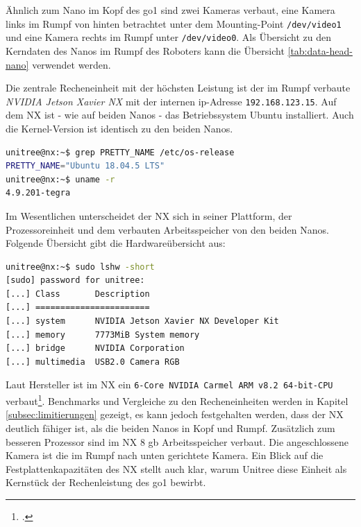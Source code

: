 Ähnlich zum Nano im Kopf des \gls{go1} sind zwei Kameras verbaut, eine Kamera links im Rumpf von hinten betrachtet unter dem Mounting-Point
\texttt{/dev/video1} und eine Kamera rechts im Rumpf unter \texttt{/dev/video0}.
Als Übersicht zu den Kerndaten des Nanos im Rumpf des Roboters kann die Übersicht \ref{tab:data-head-nano} verwendet werden.

\label{par:nx}

Die zentrale Recheneinheit mit der höchsten Leistung ist der im Rumpf verbaute \emph{NVIDIA Jetson Xavier NX} mit der internen
\gls{ip}-Adresse \texttt{192.168.123.15}.
Auf dem NX ist - wie auf beiden Nanos - das Betriebssystem Ubuntu installiert.
Auch die Kernel-Version ist identisch zu den beiden Nanos.

\begin{lstlisting}[language=sh, label=lst:nx-os]
unitree@nx:~$ grep PRETTY_NAME /etc/os-release
PRETTY_NAME="Ubuntu 18.04.5 LTS"
unitree@nx:~$ uname -r
4.9.201-tegra
\end{lstlisting}

Im Wesentlichen unterscheidet der NX sich in seiner Plattform, der Prozessoreinheit und dem verbauten Arbeitsspeicher
von den beiden Nanos.
Folgende Übersicht gibt die Hardwareübersicht aus:

\begin{lstlisting}[language=sh, label=lst:nanos-hardware-rumpf-nx, columns=fixed]
unitree@nx:~$ sudo lshw -short
[sudo] password for unitree:
[...] Class       Description
[...] =======================
[...] system      NVIDIA Jetson Xavier NX Developer Kit
[...] memory      7773MiB System memory
[...] bridge      NVIDIA Corporation
[...] multimedia  USB2.0 Camera RGB
\end{lstlisting}

Laut Hersteller ist im NX ein \texttt{6-Core NVIDIA Carmel ARM v8.2 64-\allowbreak bit-\allowbreak CPU} verbaut\footcite{nvidia_website_vergleich}.
Benchmarks und Vergleiche zu den Recheneinheiten werden in Kapitel \ref{subsec:limitierungen} gezeigt, es kann jedoch
festgehalten werden, dass der NX deutlich fähiger ist, als die beiden Nanos in Kopf und Rumpf.
Zusätzlich zum besseren Prozessor sind im NX \num{8} \gls{gb} Arbeitsspeicher verbaut.
Die angeschlossene Kamera ist die im Rumpf nach unten gerichtete Kamera.
Ein Blick auf die Festplattenkapazitäten des NX stellt auch klar, warum Unitree diese Einheit als Kernstück der Rechenleistung des
\gls{go1} bewirbt.

